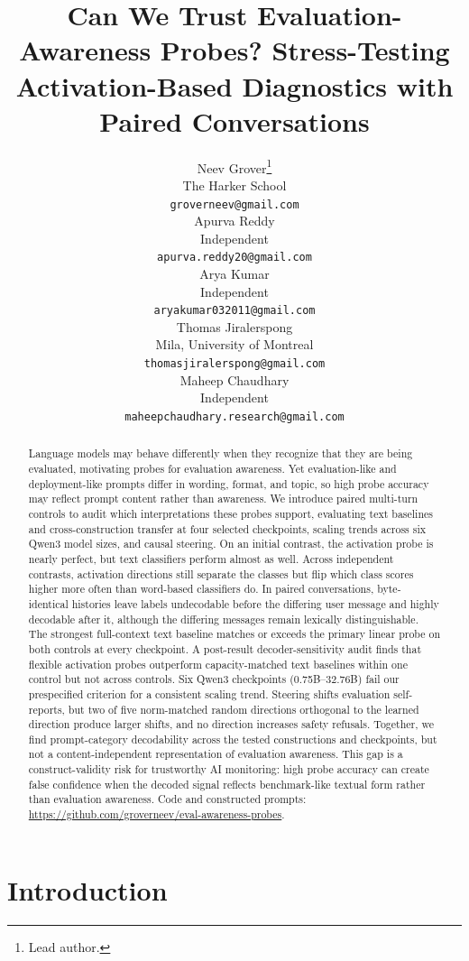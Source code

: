 \documentclass{article}
\title{Can We Trust Evaluation-Awareness Probes? Stress-Testing Activation-Based Diagnostics with Paired Conversations}
\author{%
  Neev Grover\thanks{Lead author.} \\
  The Harker School \\
  \texttt{groverneev@gmail.com} \\
  \And
  Apurva Reddy \\
  Independent \\
  \texttt{apurva.reddy20@gmail.com} \\
  \And
  Arya Kumar \\
  Independent \\
  \texttt{aryakumar032011@gmail.com} \\
  \AND
  Thomas Jiralerspong \\
  Mila, University of Montreal \\
  \texttt{thomasjiralerspong@gmail.com} \\
  \And
  Maheep Chaudhary \\
  Independent \\
  \texttt{maheepchaudhary.research@gmail.com} \\
}
\begin{document}
\maketitle

\begin{abstract}
Language models may behave differently when they recognize that they are being
evaluated, motivating probes for evaluation awareness. Yet evaluation-like and
deployment-like prompts differ in wording, format, and topic, so high
probe accuracy may reflect prompt content rather than awareness. We introduce
paired multi-turn controls to audit which interpretations these probes support,
evaluating text baselines and cross-construction transfer at four selected
checkpoints, scaling trends across six Qwen3 model sizes, and causal steering. On an initial
contrast, the activation probe is nearly perfect, but text classifiers perform
almost as well. Across independent contrasts, activation
directions still separate the classes but flip which class scores higher more
often than word-based classifiers do. In paired conversations, byte-identical
histories leave labels undecodable before the differing user message and highly
decodable after it, although the differing messages remain lexically
distinguishable. The strongest full-context text baseline matches or
exceeds the primary linear probe on both controls at every checkpoint. A
post-result decoder-sensitivity audit finds that flexible activation probes
outperform capacity-matched text baselines within one control but not across
controls. Six Qwen3 checkpoints
(0.75B--32.76B) fail our prespecified criterion for a consistent scaling trend.
Steering shifts evaluation self-reports, but two of five norm-matched random
directions orthogonal to the learned direction produce larger shifts, and no
direction increases safety refusals. Together, we find prompt-category
decodability across the tested constructions and checkpoints, but not a
content-independent representation of evaluation awareness. This gap is a
construct-validity risk for trustworthy AI monitoring: high probe accuracy can
create false confidence when the decoded signal reflects benchmark-like textual
form rather than evaluation awareness. Code and constructed prompts:
\url{https://github.com/groverneev/eval-awareness-probes}.
\end{abstract}

\section{Introduction}
\end{document}
